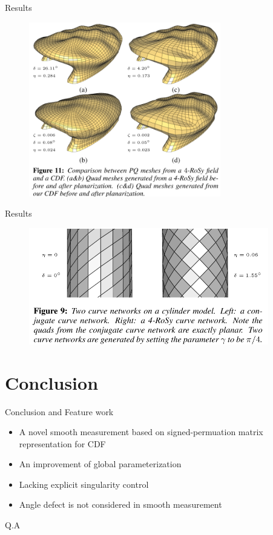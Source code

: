 \documentclass{beamer}
\begin{document}
\begin{frame}{Results}
\begin{figure}[!htb]
\centering
\includegraphics[height=3.0in]{./img/r3.png}
\end{figure}
\end{frame}

\begin{frame}{Results}
\begin{figure}[!htb]
\centering
\includegraphics[height=2.0in]{./img/r4.png}
\end{figure}
\end{frame}

\section{Conclusion}
\begin{frame}{Conclusion and Feature work}
\begin{itemize}
\item A novel smooth measurement based on signed-permuation matrix representation for CDF
\item An improvement of global parameterization
\item Lacking explicit singularity control
\item Angle defect is not considered in smooth measurement
\end{itemize}
\end{frame}

\begin{frame}{Q.A}
\end{frame}
\end{document}
